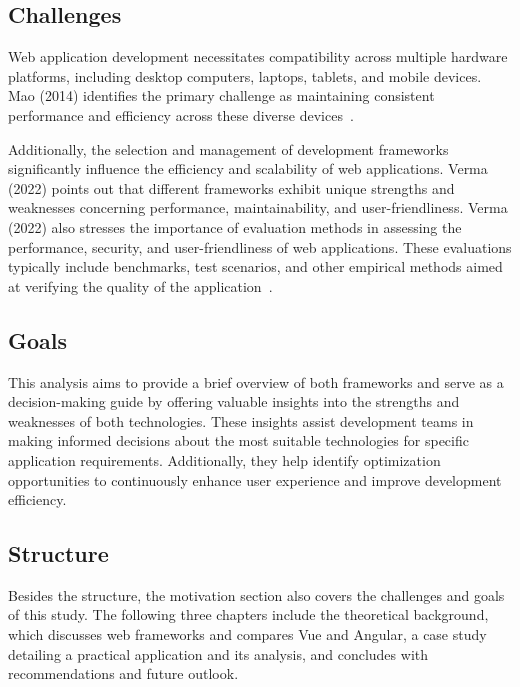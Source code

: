 \documentclass[conference]{IEEEtran}
\begin{document}
\subsection{Challenges}

Web application development necessitates compatibility across multiple hardware platforms, including desktop computers, laptops, tablets, and mobile devices. Mao (2014) identifies the primary challenge as maintaining consistent performance and efficiency across these diverse devices~\cite{mao2014developing}.

Additionally, the selection and management of development frameworks significantly influence the efficiency and scalability of web applications. Verma (2022) points out that different frameworks exhibit unique strengths and weaknesses concerning performance, maintainability, and user-friendliness. Verma (2022) also stresses the importance of evaluation methods in assessing the performance, security, and user-friendliness of web applications. These evaluations typically include benchmarks, test scenarios, and other empirical methods aimed at verifying the quality of the application~\cite{verma2022comparison}.

\subsection{Goals}
This analysis aims to provide a brief overview of both frameworks and serve as a decision-making guide by offering valuable insights into the strengths and weaknesses of both technologies. 
These insights assist development teams in making informed decisions about the most suitable technologies for specific application requirements. Additionally, they help identify optimization opportunities to continuously enhance user experience and improve development efficiency.

\subsection{Structure}
Besides the structure, the motivation section also covers the challenges and goals of this study. The following three chapters include the theoretical background, which discusses web frameworks and compares Vue and Angular, a case study detailing a practical application and its analysis, and concludes with recommendations and future outlook.
\end{document}
